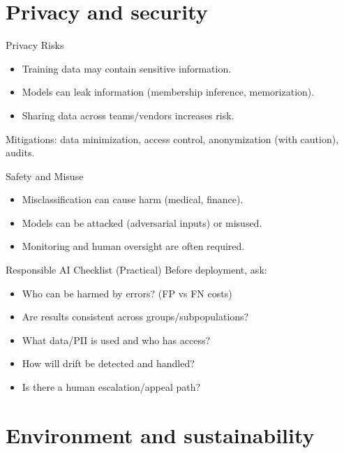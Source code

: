 \documentclass[aspectratio=169]{beamer}
\begin{document}
\section{Privacy and security}
\label{sec:privacy}

\begin{frame}{Privacy Risks}
  \begin{itemize}[<+->]
    \item Training data may contain sensitive information.
    \item Models can leak information (membership inference, memorization).
    \item Sharing data across teams/vendors increases risk.
  \end{itemize}
  \vspace{0.4em}
  Mitigations: data minimization, access control, anonymization (with caution), audits.
\end{frame}

\begin{frame}{Safety and Misuse}
  \begin{itemize}[<+->]
    \item Misclassification can cause harm (medical, finance).
    \item Models can be attacked (adversarial inputs) or misused.
    \item Monitoring and human oversight are often required.
  \end{itemize}
\end{frame}

\begin{frame}{Responsible AI Checklist (Practical)}
  Before deployment, ask:
  \begin{itemize}[<+->]
    \item Who can be harmed by errors? (FP vs FN costs)
    \item Are results consistent across groups/subpopulations?
    \item What data/PII is used and who has access?
    \item How will drift be detected and handled?
    \item Is there a human escalation/appeal path?
  \end{itemize}
\end{frame}

\section{Environment and sustainability}
\label{sec:env}
\end{document}
